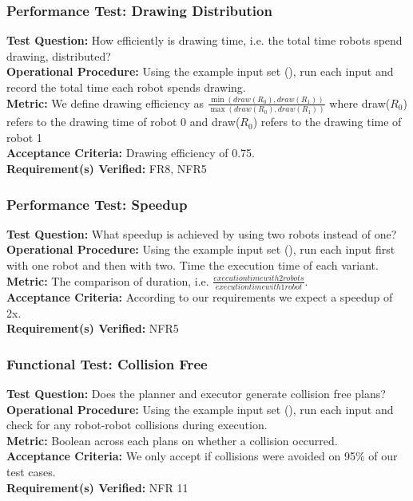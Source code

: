 \subsubsection{Performance Test: Drawing Distribution}
\label{test:sdp_pt_draw}
\textbf{Test Question:} How efficiently is drawing time, i.e. the total time robots spend drawing, distributed? \\
\textbf{Operational Procedure:} Using the example input set (), run each input and record the total time each robot spends drawing. \\
\textbf{Metric:} We define drawing efficiency as $\frac{\min(draw(R_{0}), draw(R_{1}))}{\max(draw(R_{0}), draw(R_{1}))}$ where draw($R_{0}$) refers to the drawing time of robot 0 and draw($R_{0}$) refers to the drawing time of robot 1\\
\textbf{Acceptance Criteria:} Drawing efficiency of 0.75.\\
\textbf{Requirement(s) Verified:} FR8, NFR5

\subsubsection{Performance Test: Speedup}
\label{test:sdp_pt_speedup}
\textbf{Test Question:} What speedup is achieved by using two robots instead of one?\\
\textbf{Operational Procedure:} Using the example input set (), run each input first with one robot and then with two. Time the execution time of each variant.\\
\textbf{Metric:} The comparison of duration, i.e. $\frac{execution time with 2 robots}{execution time with 1 robot}$. \\
\textbf{Acceptance Criteria:} According to our requirements we expect a speedup of 2x. \\
\textbf{Requirement(s) Verified:} NFR5

\subsubsection{Functional Test: Collision Free}
\label{test:sdp_ft_collision}
\textbf{Test Question:} Does the planner and executor generate collision free plans?\\
\textbf{Operational Procedure:} Using the example input set (), run each input and check for any robot-robot collisions during execution. \\
\textbf{Metric:} Boolean across each plans on whether a collision occurred.\\
\textbf{Acceptance Criteria:} We only accept if collisions were avoided on 95\% of our test cases. \\
\textbf{Requirement(s) Verified:} NFR 11

